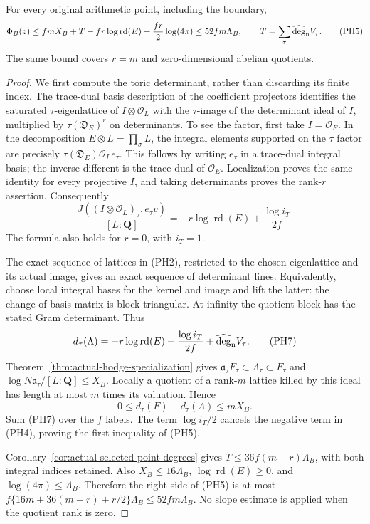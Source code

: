 \begin{proposition}
\label{prop:actual-point-determinant-bound}
For every original arithmetic point, including the boundary,
\[
 \Phi_B(z)\le fmX_B+T-fr\log\operatorname{rd}(E)
                                  +\frac{fr}{2}\log(4\pi)
                    \le52fm\Lambda_B,
 \qquad T=\sum_\tau\widehat{\deg}_{\rm n}V_\tau.
 \tag{PH5}
\]
The same bound covers $r=m$ and zero-dimensional abelian quotients.
\end{proposition}

\begin{proof}
We first compute the toric determinant, rather than discarding its
finite index. The trace-dual basis description of the coefficient
projectors identifies the saturated $\tau$-eigenlattice of
$I\otimes\mathcal O_L$ with the $\tau$-image of the determinant
ideal of $I$, multiplied by $\tau(\mathfrak D_E)^r$ on determinants.
To see the factor, first take $I=\mathcal O_E$. In the decomposition
$E\otimes L=\prod_\sigma L$, the integral elements supported on
the $\tau$ factor are precisely
$\tau(\mathfrak D_E)\mathcal O_L e_\tau$. This follows by writing
$e_\tau$ in a trace-dual integral basis; the inverse different is
the trace dual of $\mathcal O_E$. Localization proves the same
identity for every projective $I$, and taking determinants proves
the rank-$r$ assertion. Consequently
\[
 \frac{J((I\otimes\mathcal O_L)_\tau,e_\tau v)}{[L:\mathbf Q]}
       =-r\log\operatorname{rd}(E)+\frac{\log i_T}{2f}.
 \tag{PH6}
\]
The formula also holds for $r=0$, with $i_T=1$.

The exact sequence of lattices in \textup{(PH2)}, restricted to the
chosen eigenlattice and its actual image, gives an exact sequence
of determinant lines. Equivalently, choose local integral bases
for the kernel and image and lift the latter: the change-of-basis
matrix is block triangular. At infinity the quotient block has
the stated Gram determinant. Thus
\[
 d_\tau(\Lambda)
   =-r\log\operatorname{rd}(E)+\frac{\log i_T}{2f}
                              +\widehat{\deg}_{\rm n}V_\tau.
 \tag{PH7}
\]
Theorem~\ref{thm:actual-hodge-specialization} gives
$\mathfrak a_\tau F_\tau\subset\Lambda_\tau\subset F_\tau$
and $\log N\mathfrak a_\tau/[L:\mathbf Q]\le X_B$.
Locally a quotient of a rank-$m$ lattice killed by this ideal
has length at most $m$ times its valuation. Hence
\[
       0\le d_\tau(F)-d_\tau(\Lambda)\le mX_B.
\]
Sum \textup{(PH7)} over the $f$ labels. The term $\log i_T/2$
cancels the negative term in \textup{(PH4)}, proving the first
inequality of \textup{(PH5)}.

Corollary~\ref{cor:actual-selected-point-degrees} gives
$T\le36f(m-r)\Lambda_B$, with both integral indices retained.
Also $X_B\le16\Lambda_B$, $\log\operatorname{rd}(E)\ge0$,
and $\log(4\pi)\le\Lambda_B$. Therefore the right side of
\textup{(PH5)} is at most
$f\{16m+36(m-r)+r/2\}\Lambda_B\le52fm\Lambda_B$.
No slope estimate is applied when the quotient rank is zero.
\end{proof}

